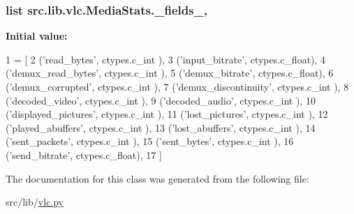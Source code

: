 \subsubsection[{\+\_\+fields\+\_\+}]{\setlength{\rightskip}{0pt plus 5cm}list src.\+lib.\+vlc.\+Media\+Stats.\+\_\+fields\+\_\+\hspace{0.3cm}{\ttfamily [static]}, {\ttfamily [private]}}\label{classsrc_1_1lib_1_1vlc_1_1MediaStats_a1f711ea68d94e8320bed627fd7be7b4d}
{\bfseries Initial value\+:}
\begin{DoxyCode}
1 = [
2         (\textcolor{stringliteral}{'read\_bytes'},          ctypes.c\_int  ),
3         (\textcolor{stringliteral}{'input\_bitrate'},       ctypes.c\_float),
4         (\textcolor{stringliteral}{'demux\_read\_bytes'},    ctypes.c\_int  ),
5         (\textcolor{stringliteral}{'demux\_bitrate'},       ctypes.c\_float),
6         (\textcolor{stringliteral}{'demux\_corrupted'},     ctypes.c\_int  ),
7         (\textcolor{stringliteral}{'demux\_discontinuity'}, ctypes.c\_int  ),
8         (\textcolor{stringliteral}{'decoded\_video'},       ctypes.c\_int  ),
9         (\textcolor{stringliteral}{'decoded\_audio'},       ctypes.c\_int  ),
10         (\textcolor{stringliteral}{'displayed\_pictures'},  ctypes.c\_int  ),
11         (\textcolor{stringliteral}{'lost\_pictures'},       ctypes.c\_int  ),
12         (\textcolor{stringliteral}{'played\_abuffers'},     ctypes.c\_int  ),
13         (\textcolor{stringliteral}{'lost\_abuffers'},       ctypes.c\_int  ),
14         (\textcolor{stringliteral}{'sent\_packets'},        ctypes.c\_int  ),
15         (\textcolor{stringliteral}{'sent\_bytes'},          ctypes.c\_int  ),
16         (\textcolor{stringliteral}{'send\_bitrate'},        ctypes.c\_float),
17     ]
\end{DoxyCode}


The documentation for this class was generated from the following file\+:\begin{DoxyCompactItemize}
\item 
src/lib/\hyperlink{vlc_8py}{vlc.\+py}\end{DoxyCompactItemize}
